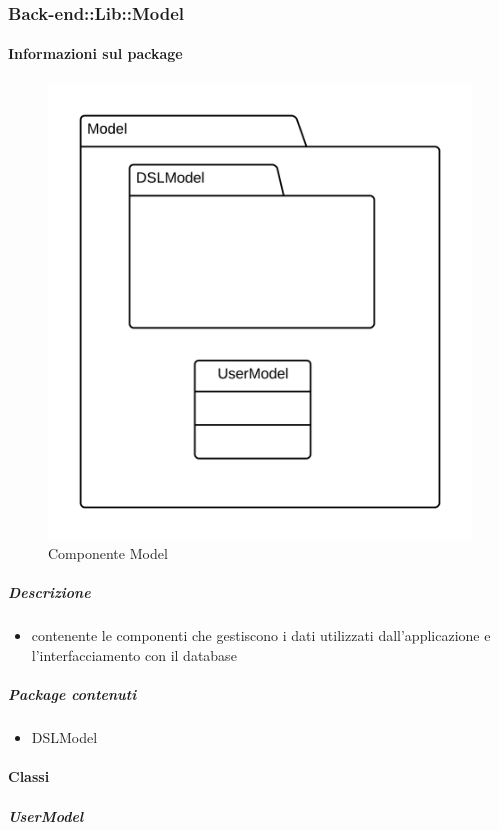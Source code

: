 	\subsubsection{Back-end::Lib::Model}
	\paragraph{Informazioni sul package} 
		\begin{figure}[H] 
			\begin{center} 
				\includegraphics[scale=0.13]{uml/package/Back-end::Lib::Model.png}  
				\caption{Componente Model}
			\end{center}  
		\end{figure} 
	\subparagraph{Descrizione} 
		\begin{itemize}
		\item[]  contenente le componenti che gestiscono i dati utilizzati dall’applicazione e l’interfacciamento con il
database
		\end{itemize} 
		\subparagraph{Package contenuti} 
		\begin{itemize}
				\item DSLModel
		\end{itemize}
		\paragraph{Classi}
			\subparagraph{UserModel}
				
